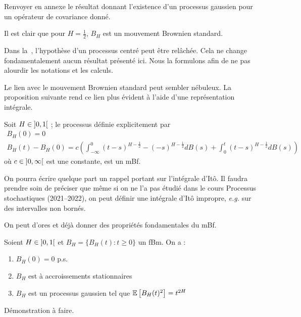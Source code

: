 
\begin{alert}
  Renvoyer en annexe le résultat donnant l'existence d'un processus
  gaussien pour un opérateur de covariance donné.
\end{alert}

Il est clair que pour $H= \frac{1}{2}$, $B_H$ est un mouvement
Brownien standard.

\begin{remarque}
  Dans la~, l'hypothèse d'un processus centré
  peut être relâchée. Cela ne change fondamentalement aucun résultat
  présenté ici. Nous la formulons afin de ne pas alourdir les
  notations et les calculs.
\end{remarque}

Le lien avec le mouvement Brownien standard peut sembler nébuleux. La
proposition suivante rend ce lien plus évident à l'aide d'une
représentation intégrale.

\begin{proposition}
  Soit $H\in\left]0,1\right[$ ; le processus définie explicitement par
  \begin{gather*}
    B_H(0) = 0 \\
    B_H(t) - B_H(0) = c\left(\int_{-\infty}^0 (t-s)^{H- \frac{1}{2}} - (-s)^{H- \frac{1}{2} } dB(s) + \int_0^t (t-s)^{H- \frac{1}{2}} dB(s)\right)
  \end{gather*}
  où $c\in\left]0,\infty\right[$ est une constante, est un mBf.
\end{proposition}

\begin{alert}
  On pourra écrire quelque part un rappel portant sur l'intégrale
  d'Itô. Il faudra prendre soin de préciser que même si on ne l'a pas
  étudié dans le cours \og Processus stochastiques\fg{} (2021--2022),
  on peut définir une intégrale d'Itô impropre, \emph{e.g.} sur des
  intervalles non bornés.
\end{alert}

On peut d'ores et déjà donner des propriétés fondamentales du mBf.

\begin{proposition}
  Soient $H\in\left]0,1\right[$ et $B_H = \{B_H(t) : t\geq 0\}$ un fBm. On
  a :
  \begin{enumerate}
  \item $B_H(0) = 0$ p.s.
  \item $B_H$ est à accroissements stationnaires
  \item $B_H$ est un processus gaussien tel que $\mathbb{E}\left[B_H(t)^2\right] = t^{2H}$
  \end{enumerate}
\end{proposition}
\begin{alert}
  Démonstration à faire.
\end{alert}


